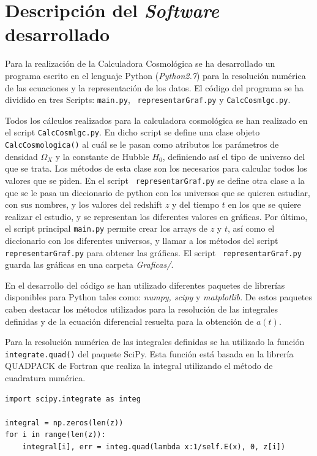 \documentclass[twoside]{article}
\begin{document}
	    \appendix

	    	\section{Descripción del \textit{Software} desarrollado}
	    		\label{appen:N1}

	    		Para la realización de la Calculadora Cosmológica se ha desarrollado un programa escrito en el lenguaje Python (\textit{Python2.7}) para la resolución numérica de las ecuaciones y la representación de los datos. El código del programa se ha dividido en tres Scripts: \texttt{main.py}, \texttt{ representarGraf.py} y \texttt{CalcCosmlgc.py}.

	    		Todos los cálculos realizados para la calculadora cosmológica se han realizado en el script \texttt{CalcCosmlgc.py}. En dicho script se define una clase objeto \texttt{CalcCosmologica()} al cuál se le pasan como atributos los parámetros de densidad $\Omega_X$ y la constante de Hubble $H_0$, definiendo así el tipo de universo del que se trata. Los métodos de esta clase son los necesarios para calcular todos los valores que se piden. En el script \texttt{ representarGraf.py} se define otra clase a la que se le pasa un diccionario de python con los universos que se quieren estudiar, con sus nombres, y los valores del redshift $z$ y del tiempo $t$ en los que se quiere realizar el estudio,  y se representan los diferentes valores en gráficas. Por último, el script principal \texttt{main.py} permite crear los arrays de $z$ y $t$, así como el diccionario con los diferentes universos, y llamar a los métodos del script \texttt{ representarGraf.py} para obtener las gráficas. El script \texttt{ representarGraf.py} guarda las gráficas en una carpeta \textit{Graficas/}.

	    		En el desarrollo del código se han utilizado diferentes paquetes de librerías disponibles para Python tales como: \textit{numpy, scipy} y \textit{matplotlib}. De estos paquetes caben destacar los métodos utilizados para la resolución de las integrales definidas y de la ecuación diferencial resuelta para la obtención de $a(t)$.

	    		Para la resolución numérica de las integrales definidas se ha utilizado la función \texttt{integrate.quad()} del paquete SciPy. Esta función está basada en la librería QUADPACK  de Fortran que realiza la integral utilizando el método de cuadratura numérica.

				\begin{lstlisting}[style=python]
import scipy.integrate as integ

integral = np.zeros(len(z))
for i in range(len(z)):
    integral[i], err = integ.quad(lambda x:1/self.E(x), 0, z[i])
				\end{lstlisting}
\end{document}
